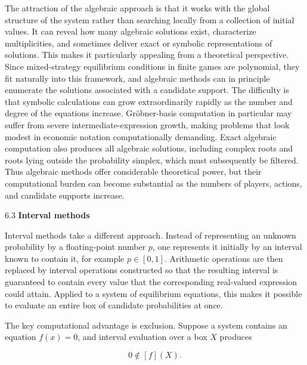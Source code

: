 \documentclass[11pt]{article}
\begin{document}
The attraction of the algebraic approach is that it works with the
global structure of the system rather than searching locally from a
collection of initial values. It can reveal how many algebraic solutions
exist, characterize multiplicities, and sometimes deliver exact or
symbolic representations of solutions. This makes it particularly
appealing from a theoretical perspective. Since mixed-strategy
equilibrium conditions in finite games are polynomial, they fit
naturally into this framework, and algebraic methods can in principle
enumerate the solutions associated with a candidate support. The
difficulty is that symbolic calculations can grow extraordinarily
rapidly as the number and degree of the equations increase.
Gröbner-basis computation in particular may suffer from severe
intermediate-expression growth, making problems that look modest in
economic notation computationally demanding. Exact algebraic computation
also produces all algebraic solutions, including complex roots and roots
lying outside the probability simplex, which must subsequently be
filtered. Thus algebraic methods offer considerable theoretical power,
but their computational burden can become substantial as the numbers of
players, actions, and candidate supports increase.

6.3 \textbf{Interval methods}

Interval methods take a different approach. Instead of representing an
unknown probability by a floating-point number \(p\), one represents it
initially by an interval known to contain it, for example \(p\in[0,1]\).
Arithmetic operations are then replaced by interval operations
constructed so that the resulting interval is guaranteed to contain
every value that the corresponding real-valued expression could attain.
Applied to a system of equilibrium equations, this makes it possible to
evaluate an entire box of candidate probabilities at once.

The key computational advantage is exclusion. Suppose a system contains
an equation \(f(x)=0\), and interval evaluation over a box \(X\)
produces

\[
0\notin [f](X).
\]
\end{document}
